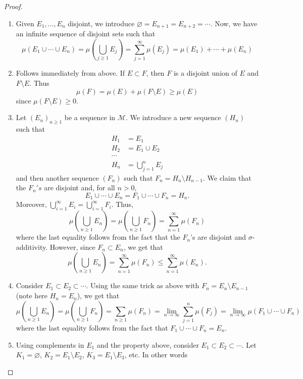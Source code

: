 \documentclass[11pt,leqno,oneside]{amsbook}
\numberwithin{thm}{section}
\newcommand{\M}{\mathcal{M}} %
\newcommand{\s}{$\sigma$-} %
\renewcommand{\emptyset}{\varnothing}
\begin{document}
\begin{proof}
  \begin{enumerate}
  \item Given $E_1, \ldots, E_n$ disjoint, we introduce $\emptyset =
    E_{n+1} = E_{n+2} = \cdots$. Now, we have an infinite sequence of
    disjoint sets such that \[
      \mu(E_1 \cup \cdots \cup E_n) = \mu(\bigcup_{j \geq 1} E_j) =
      \sum_{j = 1}^\infty \mu(E_j) = \mu(E_1) + \cdots + \mu(E_n)
    \]
  \item Follows immediately from above. If $E \subset F$, then $F$ is
    a disjoint union of $E$ and $F \setminus E$. Thus \[
      \mu(F) = \mu(E) + \mu(F \setminus E) \geq \mu(E)
    \]
    since $\mu(F \setminus E) \geq 0$.
  \item Let $(E_n)_{n \geq 1}$ be a sequence in $\M$. We introduce a
    new sequence $(H_n)$ such that
    \begin{align*}
      H_1 & = E_1 \\
      H_2 & = E_1 \cup E_2 \\
      \cdots & \\
      H_n & = \bigcup_{j=1}^n E_j
    \end{align*}
    and then another sequence $(F_n)$ such that $F_n = H_n \setminus
    H_{n-1}$. We claim that the $F_n's$ are disjoint and, for all $n >
    0$, \[
      E_1 \cup \cdots \cup E_n = F_1 \cup \cdots \cup F_n = H_n.
    \]
    Moreover, $\bigcup_{i=1}^\infty E_i = \bigcup_{i=1}^\infty
    F_i$. Thus,
    \[
      \mu(\bigcup_{n \geq 1} E_n) = \mu(\bigcup_{n \geq 1} F_n) =
      \sum_{n=1}^\infty \mu(F_n)
    \]
    where the last equality follows from the fact that the $F_n$'s are
    disjoint and \s additivity. However, since $F_n \subset
    E_n$, we get that \[
      \mu(\bigcup_{n \geq 1} E_n) =
      \sum_{n=1}^\infty \mu(F_n) \leq \sum_{n=1}^\infty \mu(E_n).
    \]
  \item Consider $E_1 \subset E_2 \subset \cdots$. Using the same
    trick as above with $F_n = E_n \setminus E_{n-1}$ (note here $H_n
    = E_n$), we get that \[
      \mu\left(\bigcup_{n \geq 1} E_n\right) = \mu\left( \bigcup_{n
          \geq 1} F_n \right) = \sum_{n \geq 1} \mu(F_n) = \lim_{n \to
      \infty} \sum_{j=1}^n \mu(F_j) = \lim_{n \to \infty} \mu(F_1 \cup
    \cdots \cup F_n)
\]
where the last equality follows from the fact that $F_1 \cup \cdots
\cup F_n = E_n$.
  \item Using complements in $E_1$ and the property above, consider $E_1
    \subset E_2 \subset \cdots$. Let $K_1 = \emptyset$, $K_2 = E_1
    \setminus E_2$, $K_3 = E_1 \setminus E_3$, etc. In other words

\end{enumerate}
\end{proof}
\end{document}
